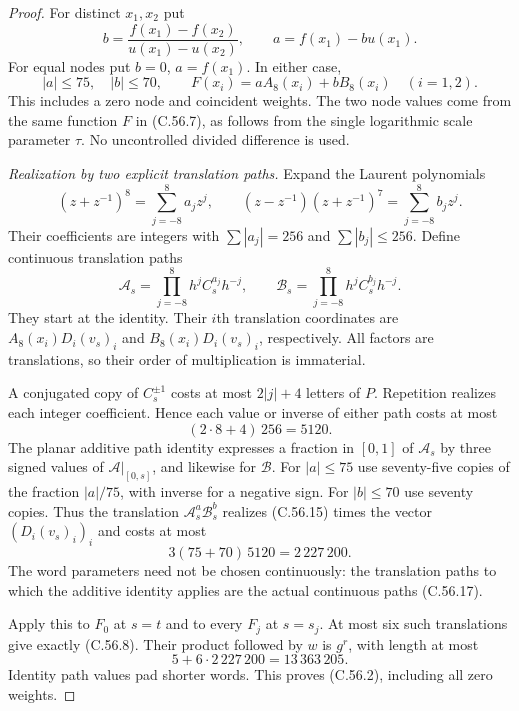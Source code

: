 \begin{proof}
For distinct $x_1,x_2$ put
\[
 b=\frac{f(x_1)-f(x_2)}{u(x_1)-u(x_2)},\qquad
                         a=f(x_1)-bu(x_1).
\]
For equal nodes put $b=0$, $a=f(x_1)$.
In either case,
\[
 |a|\leq75,\quad |b|\leq70,\qquad
 F(x_i)=aA_8(x_i)+bB_8(x_i)\quad(i=1,2).                \tag{C.56.15}
\]
This includes a zero node and coincident weights.
The two node values come from the same function
$F$ in (C.56.7), as follows from the single
logarithmic scale parameter $\tau$.
No uncontrolled divided difference is used.

\emph{Realization by two explicit translation paths.}
Expand the Laurent polynomials
\[
 (z+z^{-1})^8=\sum_{j=-8}^{8}a_jz^j,\qquad
 (z-z^{-1})(z+z^{-1})^7=\sum_{j=-8}^{8}b_jz^j.           \tag{C.56.16}
\]
Their coefficients are integers with
$\sum|a_j|=256$ and $\sum|b_j|\leq256$.
Define continuous translation paths
\[
 \mathcal A_s=\prod_{j=-8}^{8}h^jC_s^{a_j}h^{-j},
 \qquad
 \mathcal B_s=\prod_{j=-8}^{8}h^jC_s^{b_j}h^{-j}.         \tag{C.56.17}
\]
They start at the identity.
Their $i$th translation coordinates are
$A_8(x_i)D_i(v_s)_i$ and $B_8(x_i)D_i(v_s)_i$,
respectively. All factors are translations, so
their order of multiplication is immaterial.

A conjugated copy of $C_s^{\pm1}$ costs at most
$2|j|+4$ letters of $P$. Repetition realizes
each integer coefficient. Hence each value or
inverse of either path costs at most
\[
                       (2\cdot8+4)\,256=5120.          \tag{C.56.18}
\]
The planar additive path identity expresses a
fraction in $[0,1]$ of $\mathcal A_s$ by three
signed values of $\mathcal A|_{[0,s]}$, and
likewise for $\mathcal B$.
For $|a|\leq75$ use seventy-five copies of the
fraction $|a|/75$, with inverse for a negative
sign. For $|b|\leq70$ use seventy copies.
Thus the translation
$\mathcal A_s^a\mathcal B_s^b$ realizes (C.56.15)
times the vector $(D_i(v_s)_i)_i$ and costs at most
\[
                       3(75+70)\,5120=2\,227\,200.     \tag{C.56.19}
\]
The word parameters need not be chosen
continuously: the translation paths to which
the additive identity applies are the actual
continuous paths (C.56.17).

Apply this to $F_0$ at $s=t$ and to every
$F_j$ at $s=s_j$. At most six such translations
give exactly (C.56.8). Their product followed
by $w$ is $g^r$, with length at most
\[
                       5+6\cdot2\,227\,200
                                         =13\,363\,205. \tag{C.56.20}
\]
Identity path values pad shorter words.
This proves (C.56.2), including all zero weights.


\end{proof}
